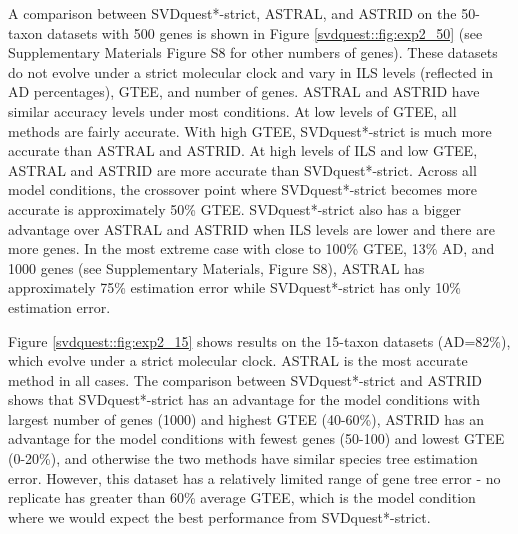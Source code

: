 

{A comparison between SVDquest*-strict, ASTRAL, and ASTRID} on the 50-taxon datasets with 500 genes is shown in Figure \ref{svdquest::fig:exp2_50}
({see Supplementary Materials Figure S8 for other numbers of genes}).
These datasets do
not evolve under a strict molecular clock and vary in ILS levels
(reflected in AD percentages), GTEE, and number of genes.  ASTRAL and
ASTRID have similar accuracy levels under most conditions.  At low
levels of GTEE, all methods are fairly accurate.  With high GTEE,
SVDquest*-strict is much more accurate than ASTRAL and ASTRID. 
At high levels
of ILS and low GTEE, ASTRAL and ASTRID are more accurate than
SVDquest*-strict.  Across all model conditions, the crossover point where
SVDquest*-strict becomes more accurate is approximately 50\% GTEE. 
SVDquest*-strict
also has a bigger advantage over ASTRAL and ASTRID when ILS levels are
lower and there are more genes. 
In the most extreme case with close to
100\% GTEE, 13\% AD, and 1000 genes
{(see Supplementary Materials, Figure S8)},
ASTRAL  has approximately 75\% estimation error while
SVDquest*-strict has only 10\% estimation error. 

Figure \ref{svdquest::fig:exp2_15} shows results on the 15-taxon datasets (AD=82\%), which
evolve under a strict molecular clock. 
ASTRAL is the most accurate method in all cases. 
The comparison between SVDquest*-strict and ASTRID shows that SVDquest*-strict
has an advantage for the model conditions with largest number of genes (1000) and highest GTEE (40-60\%),
ASTRID has an advantage for the model conditions with fewest genes (50-100) and lowest GTEE (0-20\%), and
otherwise the two methods have similar species
tree estimation error. 
However, this dataset has a relatively limited
range of gene tree error - no replicate has greater than 60\% average
GTEE, which is the model condition where we would expect the best
performance from SVDquest*-strict. 

